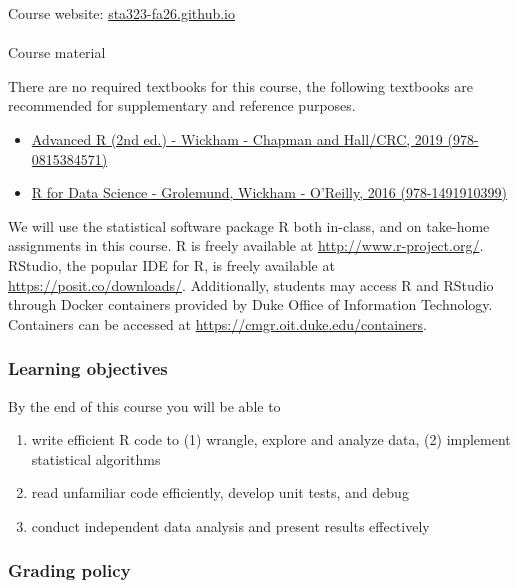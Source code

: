 \documentclass[
  12pt,
  letterpaper,
  DIV=11,
  numbers=noendperiod]{scrartcl}
\makeatletter
\let\oldparagraph\paragraph
\renewcommand{\paragraph}{
    \@ifstar
      \xxxParagraphStar
      \xxxParagraphNoStar
  }
\newcommand{\xxxParagraphStar}[1]{\oldparagraph*{#1}\mbox{}}
\newcommand{\xxxParagraphNoStar}[1]{\oldparagraph{#1}\mbox{}}
\providecommand{\tightlist}{%
  \setlength{\itemsep}{0pt}\setlength{\parskip}{0pt}}\usepackage{longtable,booktabs,array}
\makeatother
\begin{document}
Course website:
\href{https://sta323-fa26.github.io/}{sta323-fa26.github.io}

\paragraph{Course material}\label{course-material}

There are no required textbooks for this course, the following textbooks
are recommended for supplementary and reference purposes.

\begin{itemize}
\tightlist
\item
  \href{https://adv-r.hadley.nz/}{Advanced R (2nd ed.) - Wickham -
  Chapman and Hall/CRC, 2019 (978-0815384571)}
\item
  \href{https://r4ds.had.co.nz/}{R for Data Science - Grolemund, Wickham
  - O'Reilly, 2016 (978-1491910399)}
\end{itemize}

We will use the statistical software package R both in-class, and on
take-home assignments in this course. R is freely available at
\url{http://www.r-project.org/}. RStudio, the popular IDE for R, is
freely available at \url{https://posit.co/downloads/}. Additionally,
students may access R and RStudio through Docker containers provided by
Duke Office of Information Technology. Containers can be accessed at
\url{https://cmgr.oit.duke.edu/containers}.

\subsubsection{Learning objectives}\label{learning-objectives}

By the end of this course you will be able to

\begin{enumerate}
\def\labelenumi{\arabic{enumi}.}
\item
  write efficient R code to (1) wrangle, explore and analyze data, (2)
  implement statistical algorithms
\item
  read unfamiliar code efficiently, develop unit tests, and debug
\item
  conduct independent data analysis and present results effectively
\end{enumerate}

\subsubsection{Grading policy}\label{grading-policy}
\end{document}
